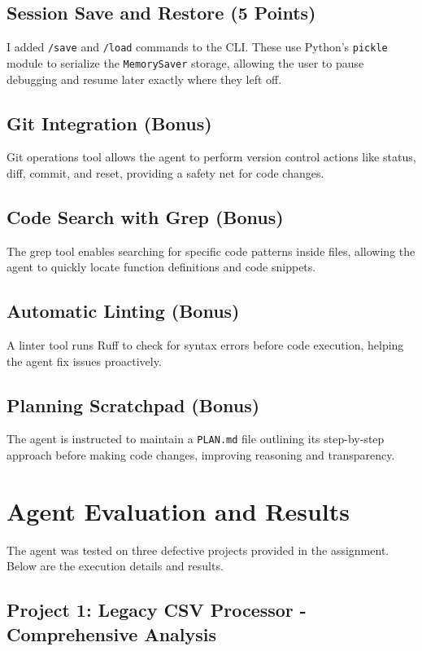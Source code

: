 \documentclass[12pt, a4paper]{article}
\begin{document}
\subsection{Session Save and Restore (5 Points)}
I added \texttt{/save} and \texttt{/load} commands to the CLI. These use Python's \texttt{pickle} module to serialize the \texttt{MemorySaver} storage, allowing the user to pause debugging and resume later exactly where they left off.

\subsection{Git Integration (Bonus)}
Git operations tool allows the agent to perform version control actions like status, diff, commit, and reset, providing a safety net for code changes.

\subsection{Code Search with Grep (Bonus)}
The grep tool enables searching for specific code patterns inside files, allowing the agent to quickly locate function definitions and code snippets.

\subsection{Automatic Linting (Bonus)}
A linter tool runs Ruff to check for syntax errors before code execution, helping the agent fix issues proactively.

\subsection{Planning Scratchpad (Bonus)}
The agent is instructed to maintain a \texttt{PLAN.md} file outlining its step-by-step approach before making code changes, improving reasoning and transparency.

\section{Agent Evaluation and Results}
The agent was tested on three defective projects provided in the assignment. Below are the execution details and results.

\subsection{Project 1: Legacy CSV Processor - Comprehensive Analysis}
\end{document}
